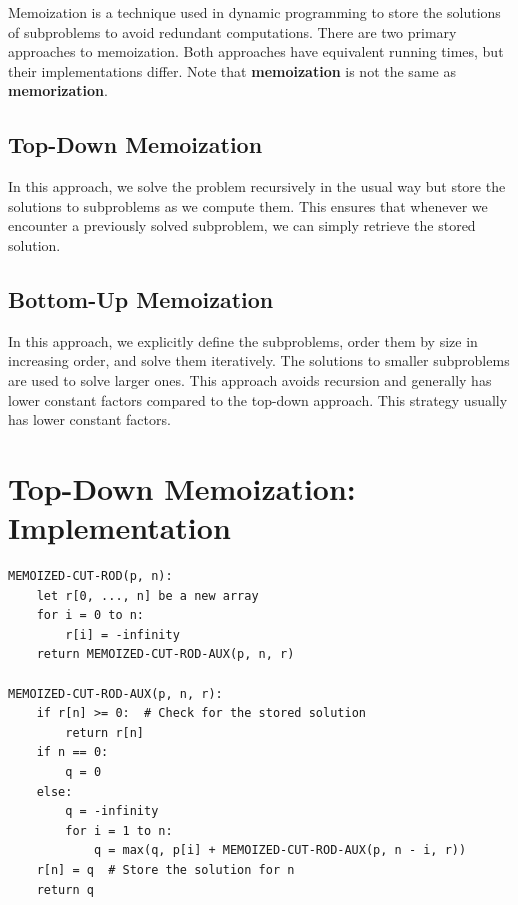 Memoization is a technique used in dynamic programming to store the solutions of subproblems to avoid redundant computations. There are two primary approaches to memoization. Both approaches have equivalent running times, but their implementations differ. Note that \textbf{memoization} is not the same as \textbf{memorization}.

\subsection{Top-Down Memoization}
In this approach, we solve the problem recursively in the usual way but store the solutions to subproblems as we compute them. This ensures that whenever we encounter a previously solved subproblem, we can simply retrieve the stored solution.

\subsection{Bottom-Up Memoization}
In this approach, we explicitly define the subproblems, order them by size in increasing order, and solve them iteratively. The solutions to smaller subproblems are used to solve larger ones. This approach avoids recursion and generally has lower constant factors compared to the top-down approach. This strategy usually has lower constant factors.



\section{Top-Down Memoization: Implementation}

\begin{verbatim}
MEMOIZED-CUT-ROD(p, n):
    let r[0, ..., n] be a new array
    for i = 0 to n:
        r[i] = -infinity
    return MEMOIZED-CUT-ROD-AUX(p, n, r)

MEMOIZED-CUT-ROD-AUX(p, n, r):
    if r[n] >= 0:  # Check for the stored solution
        return r[n]
    if n == 0:
        q = 0
    else:
        q = -infinity
        for i = 1 to n:
            q = max(q, p[i] + MEMOIZED-CUT-ROD-AUX(p, n - i, r))
    r[n] = q  # Store the solution for n
    return q
\end{verbatim}





